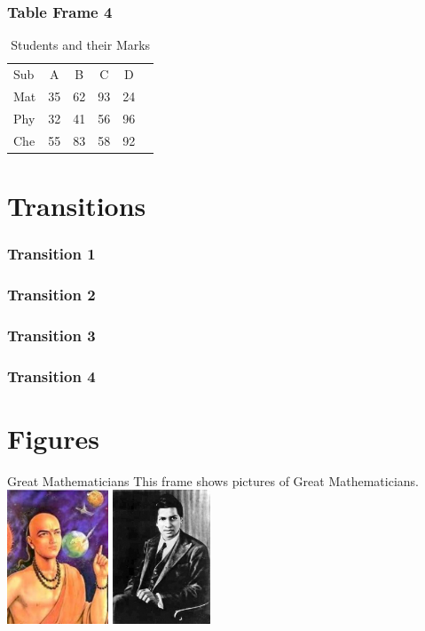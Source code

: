 \documentclass{beamer}
\begin{document}
\begin{frame}
\frametitle{Table Frame 4}
\begin{table}
\centering
\caption{Students and their Marks}
\begin{tabular}{lc<{\onslide<2->}c<{\onslide<3->}c<{\onslide<4->}c<{\onslide}c}
  Sub & A & B & C & D \\
  Mat     & 35 & 62 & 93 & 24 \\
  Phy     & 32 & 41 & 56 & 96 \\
  Che     &55&83&58&92
\end{tabular}
\end{table}
\end{frame}
	\section{Transitions}
	\begin{frame}
		\frametitle{Transition 1}
		\transdissolve
		\lipsum[1-1]
	\end{frame}
	
	\begin{frame}
		\frametitle{Transition 2}
		\transblindshorizontal
		\lipsum[2-2]
	\end{frame}
	
	\begin{frame}
		\frametitle{Transition 3}
		\transblindsvertical
		\lipsum[3-3]
	\end{frame}
	
	\begin{frame}
		\frametitle{Transition 4}
		\transboxin
		\lipsum[4-4]
	\end{frame}
	\section{Figures}
	\begin{frame}[t]{Great Mathematicians}
		This frame shows pictures of Great Mathematicians.
		\includegraphics[height = 4cm]{aryabhatta}
		\includegraphics[height = 4cm]{Srinivasa}
	\end{frame}
\end{document}
